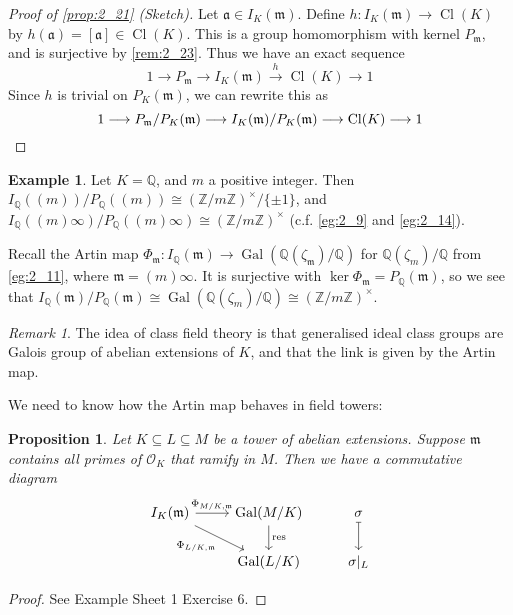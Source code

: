 \documentclass[11pt]{article}
\theoremstyle{definition}
\newtheorem{example}[definition]{Example}
\theoremstyle{plain}
\newtheorem{proposition}[definition]{Proposition}
\theoremstyle{remark}
\newtheorem{remark}[definition]{Remark}
\DeclareMathOperator{\Gal}{Gal}
\DeclareMathOperator{\Cl}{Cl}
\DeclareMathOperator{\res}{res}
\newcommand{\ZZ}{\mathbb{Z}}
\newcommand{\QQ}{\mathbb{Q}}
\newcommand{\cO}{\mathcal{O}}
\newcommand{\fa}{\mathfrak{a}}
\newcommand{\fm}{\mathfrak{m}}
\begin{document}
\begin{proof}[Proof of \autoref{prop:2_21} (Sketch)]
    Let $\fa \in I_K(\fm)$. Define $h : I_K(\fm) \to \Cl(K)$ by $h(\fa) = [\fa] \in \Cl(K)$. This is a group homomorphism with kernel $P_\fm$, and is surjective by \autoref{rem:2_23}. Thus we have an exact sequence
    \begin{equation*}
        1 \longrightarrow P_\fm \longrightarrow I_K(\fm) \overset{h}{\longrightarrow} \Cl(K) \longrightarrow 1
    \end{equation*}
    Since $h$ is trivial on $P_K(\fm)$, we can rewrite this as
    \begin{equation*}
        1 \longrightarrow P_\fm/P_K(\fm) \longrightarrow I_K(\fm)/P_K(\fm) \longrightarrow \Cl(K) \longrightarrow 1 \qedhere
    \end{equation*}
\end{proof}

\begin{example}\label{eg:2_24}
    Let $K = \QQ$, and $m$ a positive integer. Then $I_\QQ((m))/P_\QQ((m)) \cong (\ZZ/m\ZZ)^\times / \{\pm 1\}$, and $I_\QQ((m)\infty)/P_\QQ((m)\infty) \cong (\ZZ/m\ZZ)^\times$ (c.f. \autoref{eg:2_9} and \autoref{eg:2_14}).

    Recall the Artin map $\Phi_\fm : I_\QQ(\fm) \to \Gal(\QQ(\zeta_\fm) / \QQ)$ for $\QQ(\zeta_m)/\QQ$ from \autoref{eg:2_11}, where $\fm = (m) \infty$. It is surjective with $\ker \Phi_\fm = P_\QQ(\fm)$, so we see that $I_\QQ(\fm)/P_\QQ(\fm) \cong \Gal(\QQ(\zeta_m)/\QQ) \cong (\ZZ/m\ZZ)^\times$.
\end{example}

\begin{remark}\label{rem:2_25}
    The idea of class field theory is that generalised ideal class groups are Galois group of abelian extensions of $K$, and that the link is given by the Artin map.
\end{remark}

\noindent We need to know how the Artin map behaves in field towers:

\begin{proposition}\label{prop:2_26}
    Let $K \subseteq L \subseteq M$ be a tower of abelian extensions. Suppose $\fm$ contains all primes of $\cO_K$ that ramify in $M$. Then we have a commutative diagram
    \begin{equation*}
    \begin{tikzcd}
        I_K(\fm) \arrow[r, "\Phi_{M/K,\fm}"] \arrow[rd, "\Phi_{L/K,\fm}"'] & \Gal(M/K) \arrow[d, "\res"] & \sigma \arrow[d, mapsto]\\
                                                                           & \Gal(L/K) & \sigma \vert_L
    \end{tikzcd}
    \end{equation*}
\end{proposition}
\begin{proof}
    See Example Sheet 1 Exercise 6.
\end{proof}
\end{document}
